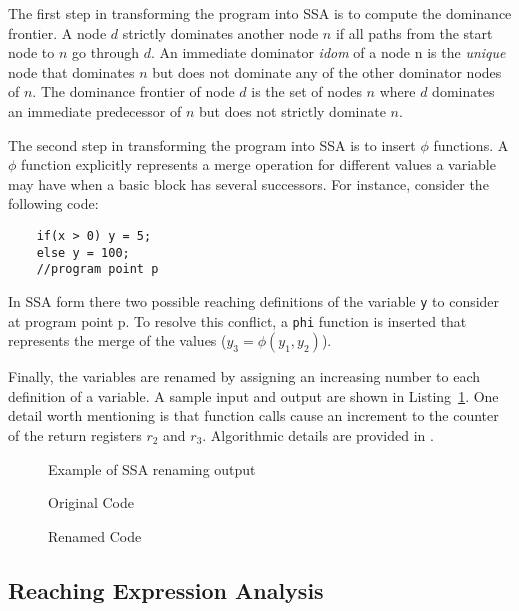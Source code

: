 	The first step in transforming the program into SSA is to compute the dominance frontier. 
	A node $d$ strictly dominates another node $n$ if all paths from the start node to $n$ go through $d$. 
	An immediate dominator \emph{idom} of a node n is the \emph{unique} node that dominates $n$ but does not dominate any of the other dominator nodes of $n$. 
	The dominance frontier of node $d$ is the set of nodes $n$ where $d$ dominates an immediate predecessor of $n$ but does not strictly dominate $n$. 
	
	The second step in transforming the program into SSA is to insert $\phi$ functions. A $\phi$ function explicitly represents a merge operation for different values a variable may have when a basic block has several successors. For instance, consider the following code:
	\clearpage
	\begin{lstlisting}
	if(x > 0) y = 5;
	else y = 100;
	//program point p
	\end{lstlisting}
	
	In SSA form there two possible reaching definitions of the variable \texttt{y} to consider at program point p. 
	To resolve this conflict, a \texttt{phi} function is inserted that represents the merge of the values ($y_3 = \phi(y_1,y_2)$).

	Finally, the variables are renamed by assigning an increasing number to each definition of a variable. 
	A sample input and output are shown in Listing~\ref{l:ssa-example}. One detail worth mentioning is that function calls cause an increment to the counter of the return registers $r_2$ and $r_3$.
	Algorithmic details are provided in \cite{andrew2002modern}.
	

\begin{figure}[h]
\captionsetup{type=lstlisting}
\caption{Example of SSA renaming output}
\begin{sublstlisting}[t]{0.47\linewidth}
\caption{Original Code}

\end{sublstlisting} \hfill
\begin{sublstlisting}[t]{0.47\linewidth}
\caption{Renamed Code}

\end{sublstlisting}
\label{l:ssa-example}
\end{figure}




\subsection{Reaching Expression Analysis}

